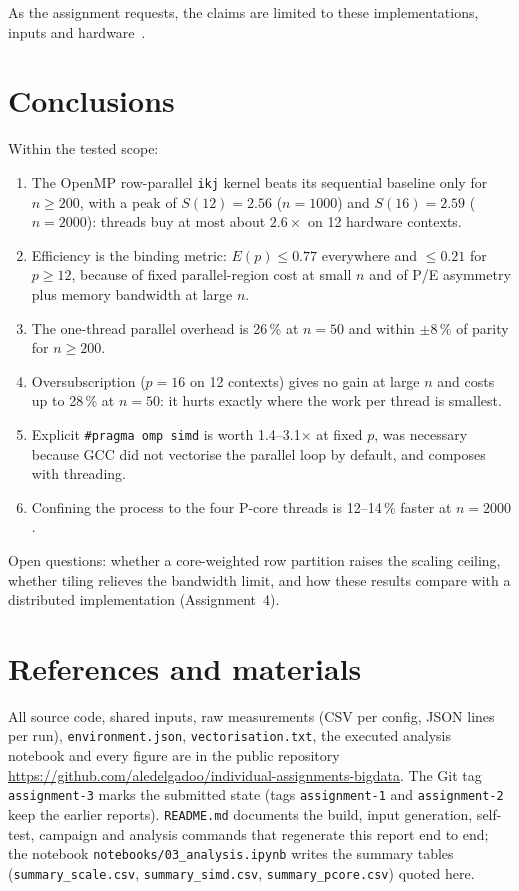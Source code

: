 \documentclass[11pt,a4paper]{article}
\begin{document}
As the assignment requests, the claims are limited to these
implementations, inputs and hardware~\cite{fleming1986,mytkowicz2009}.

\section{Conclusions}

Within the tested scope:
\begin{enumerate}
  \item The OpenMP row-parallel \texttt{ikj} kernel beats its sequential
        baseline only for $n \ge 200$, with a peak of $S(12)=2.56$
        ($n=1000$) and $S(16)=2.59$ ($n=2000$): threads buy at most about
        $2.6\times$ on 12 hardware contexts.
  \item Efficiency is the binding metric: $E(p) \le 0.77$ everywhere and
        $\le 0.21$ for $p \ge 12$, because of fixed parallel-region cost at
        small $n$ and of P/E asymmetry plus memory bandwidth at large $n$.
  \item The one-thread parallel overhead is 26\,\% at $n=50$ and within
        $\pm 8$\,\% of parity for $n \ge 200$.
  \item Oversubscription ($p=16$ on 12 contexts) gives no gain at large $n$
        and costs up to 28\,\% at $n=50$: it hurts exactly where the work
        per thread is smallest.
  \item Explicit \texttt{\#pragma omp simd} is worth 1.4--3.1$\times$ at
        fixed $p$, was necessary because GCC did not vectorise the parallel
        loop by default, and composes with threading.
  \item Confining the process to the four P-core threads is 12--14\,\%
        faster at $n=2000$.
\end{enumerate}

Open questions: whether a core-weighted row partition raises the scaling
ceiling, whether tiling relieves the bandwidth limit, and how these results
compare with a distributed implementation (Assignment~4).

\section{References and materials}

{\sloppy
All source code, shared inputs, raw measurements (CSV per config, JSON lines
per run), \texttt{environment.json}, \texttt{vectorisation.txt}, the
executed analysis notebook and every figure are in the public repository
\url{https://github.com/aledelgadoo/individual-assignments-bigdata}. The
Git tag \texttt{assignment-3} marks the submitted state (tags
\texttt{assignment-1} and \texttt{assignment-2} keep the earlier reports).
\texttt{README.md} documents the build, input generation, self-test,
campaign and analysis commands that regenerate this report end to end; the
notebook \texttt{notebooks/03\_analysis.ipynb} writes the summary tables
(\texttt{summary\_scale.csv}, \texttt{summary\_simd.csv},
\texttt{summary\_pcore.csv}) quoted here.\par}
\end{document}
